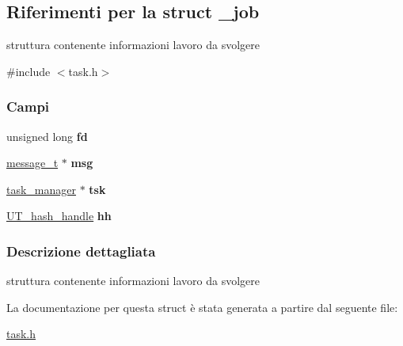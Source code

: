 \hypertarget{struct__job}{}\subsection{Riferimenti per la struct \+\_\+job}
\label{struct__job}


struttura contenente informazioni lavoro da svolgere  




{\ttfamily \#include $<$task.\+h$>$}

\subsubsection*{Campi}
\begin{DoxyCompactItemize}
\item 
\mbox{\label{struct__job_adfb74f237a124065be6ff3895281eebd}} 
unsigned long {\bfseries fd}
\item 
\mbox{\label{struct__job_abc83baf466739ce11c77c1dbb7f11afb}} 
\mbox{\hyperlink{structmessage__t}{message\+\_\+t}} $\ast$ {\bfseries msg}
\item 
\mbox{\label{struct__job_affdf67e83970d3160060e28a5262e7f4}} 
\mbox{\hyperlink{struct__task__manager}{task\+\_\+manager}} $\ast$ {\bfseries tsk}
\item 
\mbox{\label{struct__job_a4b5f5aa9ba5f75963cfdb812f2b2e4f3}} 
\mbox{\hyperlink{structUT__hash__handle}{U\+T\+\_\+hash\+\_\+handle}} {\bfseries hh}
\end{DoxyCompactItemize}


\subsubsection{Descrizione dettagliata}
struttura contenente informazioni lavoro da svolgere 

La documentazione per questa struct è stata generata a partire dal seguente file\+:\begin{DoxyCompactItemize}
\item 
\mbox{\hyperlink{task_8h}{task.\+h}}\end{DoxyCompactItemize}
